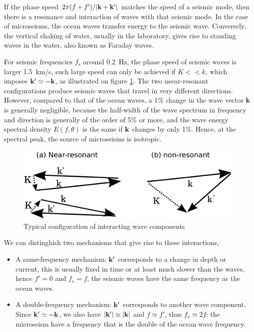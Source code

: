 If the phase speed $2 \pi (f+f')/|\mathbf{k}+\mathbf{k^{\prime}}|$ matches the speed of a seismic mode, 
then there is a resonance and interaction of waves with that seismic mode. In the case of microseisms, the ocean waves transfer energy to the seismic wave. 
Conversely, the vertical shaking of water, usually in the laboratory, gives rise to standing waves in the water, also known as Faraday waves. 

For seismic frequencies $f_s$ around $0.2$~Hz, the phase speed of seismic waves is larger 1.5~km/s, such large speed can only be achieved if $K << k$, which imposes $\mathbf{k^{\prime}} \simeq - \mathbf{k}$, as illustrated on 
figure \ref{fig:kpluskprime}. The two neear-resonant configurations produce seismic waves that travel in very different directions. However, compared to that 
of the ocean waves, a 1\% change in the wave vector $\mathbf{k}$ is generally negligible, because the half-width of the wave spectrum in frequency and direction is generally of the order of 5\% or more, 
and the wave energy spectral density $E(f,\theta)$ is the same if $\mathbf{k}$ changes by only 1\%. Hence, 
at the spectral peak, the source of microseisms is isotropic. 
\begin{figure}[htb]
\centerline{\includegraphics[width=\textwidth]{FIGS_CH_SISMO/Fdiagram3.pdf}}
  \caption{Typical configuration of interacting wave components}
\label{fig:kpluskprime}
\end{figure}

We can distinghish two mechanisms that give rise to these interactions, 
\begin{itemize}
 \item A same-frequency mechanism:  $\mathbf{k^{\prime}}$ corresponds to a change in depth or current, this is usually fixed in time or at least much slower than the waves, hence $f'=0$ and $f_s=f$, the seismic 
 waves have the same frequency as the ocean waves. 
 \item A double-frequency mechanism:  $\mathbf{k^{\prime}}$ corresponds to another wave component. Since  $\mathbf{k^{\prime}} \simeq - \mathbf{k}$, we also have   $|\mathbf{k^{\prime}}| \simeq |\mathbf{k}|$  and $f \simeq f'$, thus $f_s \simeq 2 f$: the 
 microseism have a frequency that is the double of the ocean wave frequency. 
\end{itemize}

